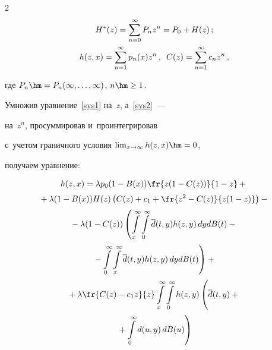 \begin{multicols}{2}
\begin{gather*}
H^*(z)=\sum\limits_{n=0}^\infty  P_n z^n=


P_0+H(z)\,; \\


h(z,x)=\sum\limits_{n=1}^\infty  p_n(x) z^n\,, \enskip


C(z)= \sum\limits_{n=1}^\infty  c_n z^n\,,


\end{gather*}





\noindent где $P_n\hm=P_n(\infty,\ld,\infty)$, $n \hm\ge 1$.


Умножив уравнение~\eqref{sys1} на~$z$, а~\eqref{sys2}~---


на~$z^n$, просуммировав и~проинтегрировав


с~учетом граничного условия $\lim\nolimits_{x\to \infty} h(z,x)\hm= 0$,


получаем уравнение:


\begin{multline}


h(z,x) = \lambda p_0 (1-B(x)) \fr{z (1-C(z))}{1-z}


+ {}\\[2pt]


{}+


\lambda (1-B(x))  H(z) \left ( C(z) + c_1 + \fr{z^2 - C(z)}{z(1-z)} \right )


- {}


\\[2pt]


{}- \lambda (1- C(z)) \left(


\int\limits_x^\infty \int\limits_0^\infty \d(t,y) h(z,y)\, dy  dB(t) -{}\right.\\[2pt]


\left.{}-


\int\limits_0^\infty \int\limits_x^\infty \d(t,y) h(z,y)\, dy  dB(t)


\right)


+{}


\\[2pt]


{}+


\lambda \fr{C(z)-c_1 z}{z} \int\limits_x^\infty


\int\limits_0^\infty h(z,y) \left(


\vphantom{\int\limits_0^\infty}


\d(t,y) +{}\right.\\[2pt]


\left.{}+ \int\limits_0^\infty d(u,y) \,dB(u) \right)



\end{multline}
\end{multicols}
